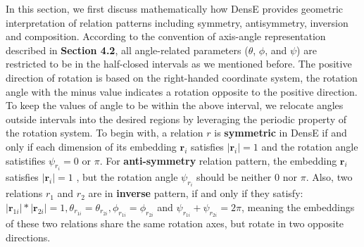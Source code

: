 \documentclass[11pt]{article}
\begin{document}
In this section, we first discuss mathematically how DensE provides geometric interpretation of relation patterns including symmetry, antisymmetry, inversion and composition. According to the convention of axis-angle representation described in \textbf{Section 4.2}, all angle-related parameters (\(\theta\), \(\phi\), and \(\psi\)) are restricted to be in the half-closed intervals as we mentioned before. The positive direction of rotation is based on the right-handed coordinate system, the rotation angle with the minus value indicates a rotation opposite to the positive direction. To keep the values of angle to be within the above interval, we relocate angles outside intervals into the desired regions by leveraging the periodic property of the rotation system.   
To begin with, a relation \(r\) is \textbf{symmetric} in DensE if and only if each dimension of its embedding \(\textbf{r}_i\) satisfies \(|\textbf{r}_i|=1\) and the rotation angle satistifies \(\psi_{r_i} = 0 \text{ or } \pi\). 
For \textbf{anti-symmetry} relation pattern, the embedding \(\textbf{r}_i\) satisfies \(|\textbf{r}_i|=1\) , but the rotation angle \(\psi_{r_i}\) should be neither \(0\) nor \(\pi\).
Also, two relations \(r_1\) and \(r_2\) are in \textbf{inverse} pattern, if and only if they satisfy: \(|\textbf{r}_{1i}|*|\textbf{r}_{2i}|=1, \theta_{r_{1i}} = \theta_{r_{2i}}, \phi_{r_{1i}} = \phi_{r_{2i}}\) and \(\psi_{r_{1i}} + \psi_{r_{2i}} = 2\pi\), meaning the embeddings of these two relations share the same rotation axes, but rotate in two opposite directions.
\end{document}

